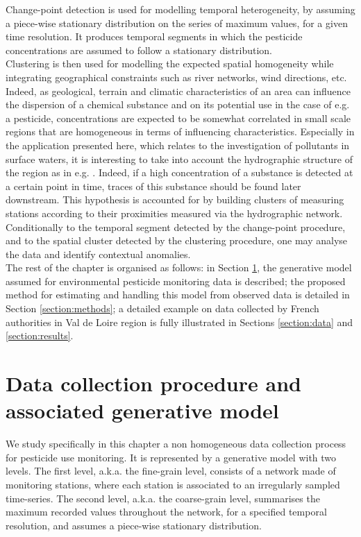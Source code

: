 Change-point detection is used for modelling temporal heterogeneity, by assuming a piece-wise stationary distribution on the series of maximum values, for a given time resolution. It produces temporal segments in which the pesticide concentrations are assumed to follow a stationary distribution. \\
Clustering is then used for modelling the expected spatial homogeneity while integrating geographical constraints such as river networks, wind directions, etc. Indeed, as geological, terrain and climatic characteristics of an area can influence the dispersion of a chemical substance and on its potential use in the case of e.g. a pesticide, concentrations are expected to be somewhat correlated in small scale regions that are homogeneous in terms of influencing characteristics. Especially in the application presented here, which relates to the investigation of pollutants in surface waters, it is interesting to take into account the hydrographic structure of the region as in e.g. \cite{doi:10.1080/07474946.2020.1826796}. Indeed, if a high concentration of a substance is detected at a certain point in time, traces of this substance should be found later downstream.
This hypothesis is accounted for by building clusters of measuring stations according to their proximities measured via the hydrographic network. \\
Conditionally to the temporal segment detected by the change-point procedure, and to the spatial cluster detected by the clustering procedure, one may analyse the data and identify contextual anomalies. \\
The rest of the chapter is organised as follows: in Section \ref{section:data:model}, the generative model assumed for environmental pesticide monitoring data is described; the proposed method for estimating and handling this model from observed data is detailed in Section \ref{section:methods}; a detailed example on data collected by French authorities in Val de Loire region is fully illustrated in Sections \ref{section:data} and \ref{section:results}. 

\section{Data collection procedure and associated generative model}\label{section:data:model}
We study specifically in this chapter a non homogeneous data collection process for pesticide use monitoring. It is represented by a generative model with two levels. The first level, a.k.a. the fine-grain level, consists of a network made of monitoring stations, where each station is associated to an irregularly sampled time-series. The second level, a.k.a. the coarse-grain level, summarises the maximum recorded values throughout the network, for a specified temporal resolution, and assumes a piece-wise stationary distribution. 

